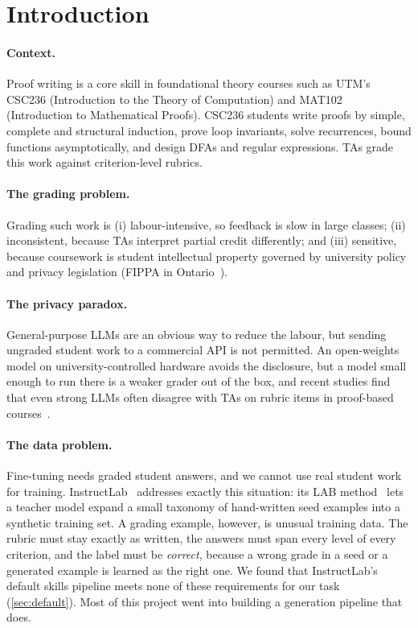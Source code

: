 \documentclass[11pt,a4paper]{article}
\newif\ifdraft
\newcommand{\todo}[2]{%
  \ifdraft\textcolor{red}{\textbf{[TODO #1:} #2\textbf{]}}\fi}
\theoremstyle{definition}
\begin{document}
\section{Introduction}\label{sec:intro}

\paragraph{Context.}
Proof writing is a core skill in foundational theory courses such as UTM's CSC236 (Introduction to the Theory of Computation) and MAT102 (Introduction to Mathematical Proofs).
CSC236 students write proofs by simple, complete and structural induction, prove loop invariants, solve recurrences, bound functions asymptotically, and design DFAs and regular expressions. TAs grade this work against criterion-level rubrics.

\paragraph{The grading problem.}
Grading such work is (i) labour-intensive, so feedback is slow in large classes; (ii) inconsistent, because TAs interpret partial credit differently; and (iii) sensitive, because coursework is student intellectual property governed by university policy and privacy legislation (FIPPA in Ontario~\cite{fippa}).

\paragraph{The privacy paradox.}
General-purpose LLMs are an obvious way to reduce the labour, but sending ungraded student work to a commercial API is not permitted. An open-weights model on university-controlled hardware avoids the disclosure, but a model small enough to run there is a weaker grader out of the box, and recent studies find that even strong LLMs often disagree with TAs on rubric items in proof-based courses~\cite{mahinpei2026tas}.
\todo{}{Add our own zero-shot baseline numbers from \cref{sec:results} here once they exist, or keep this sentence as the motivation.}

\paragraph{The data problem.}
Fine-tuning needs graded student answers, and we cannot use real student work for training. InstructLab~\cite{instructlab} addresses exactly this situation: its LAB method~\cite{sudalairaj2024lab} lets a teacher model expand a small taxonomy of hand-written seed examples into a synthetic training set. A grading example, however, is unusual training data. The rubric must stay exactly as written, the answers must span every level of every criterion, and the label must be \emph{correct}, because a wrong grade in a seed or a generated example is learned as the right one. We found that InstructLab's default skills pipeline meets none of these requirements for our task (\cref{sec:default}). Most of this project went into building a generation pipeline that does.
\end{document}
